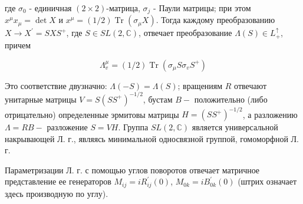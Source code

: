 \documentclass[10pt]{article}
\begin{document}
где $\sigma_{0}$ - единичная $(2 \times 2)$-матрица, $\sigma_{j}$ - Паули матрицы; при этом $x^{\mu} x_{\mu}=\operatorname{det} X$ и $x^{\mu}=(1 / 2) \operatorname{Tr}\left(\sigma_{\mu} X\right)$. Тогда каждому преобразованию $X \rightarrow X^{\prime}=S X S^{+}$, где $S \in S L(2, \mathbb{C})$, отвечает преобразование $\Lambda(S) \in L_{+}^{\uparrow}$, причем



\[

\Lambda_{v}^{\mu}=(1 / 2) \operatorname{Tr}\left(\sigma_{\mu} S \sigma_{v} S^{+}\right)

\]



Это соответствие двузначно: $\Lambda(-S)=\Lambda(S)$; вращениям $R$ отвечают унитарные матрицы $V=S\left(S S^{+}\right)^{-1 / 2}$, бустам $B-$ положительно (либо отрицательно) определенные эрмитовы матрицы $H=\left(S S^{+}\right)^{-1 / 2}$, а разложению $\Lambda=R B-$ разложение $S=V H$. Группа $S L(2, \mathbb{C})$ является универсальной накрывающей Л. г., являясь минимальной односвязной группой, гомоморфной Л. г.



Параметризации Л. г. с помощью углов поворотов отвечает матричное представление ее генераторов $M_{i j}=i R_{i j}^{\prime}(0)$, $M_{0 k}=i B_{0 k}^{\prime}(0)$ (штрих означает здесь производную по углу).
\end{document}
